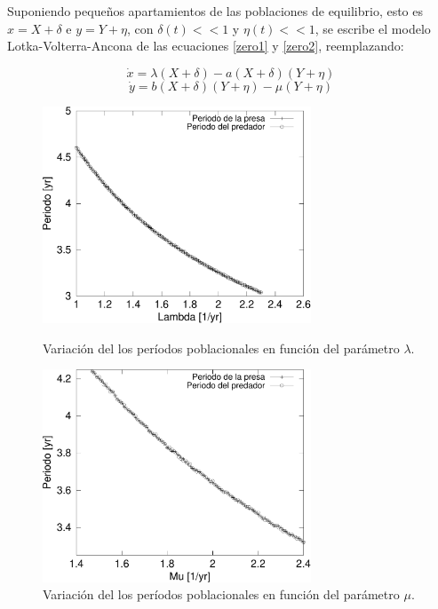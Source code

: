 \documentclass{article}
\numberwithin{equation}{section}
\begin{document}
\begin{multicols}{2}
Suponiendo pequeños apartamientos de las poblaciones de equilibrio, esto es $x = X + \delta$ e $y = Y + \eta$, con $\delta(t) << 1$ y $\eta(t) << 1$, se escribe el modelo Lotka-Volterra-Ancona de las ecuaciones \ref{zero1} y \ref{zero2}, reemplazando:

\begin{equation}
\dot x = \lambda (X + \delta) - a (X + \delta) (Y + \eta)
\end{equation}
\begin{equation}
\dot y = b (X + \delta) (Y + \eta) - \mu (Y + \eta)
\end{equation}

\begin{figure}[H]
\centering
\includegraphics[width=8cm]{images/c2} \
\caption{Variación del los períodos poblacionales en función del parámetro $\lambda$.}
\label{variacion_periodo_lambda}
\end{figure}


\begin{figure}[H]
\centering
\includegraphics[width=8cm]{images/c1}
\caption{Variación del los períodos poblacionales en función del parámetro $\mu$.}
\label{variacion_periodo_mu}
\end{figure}


\end{multicols}
\end{document}
